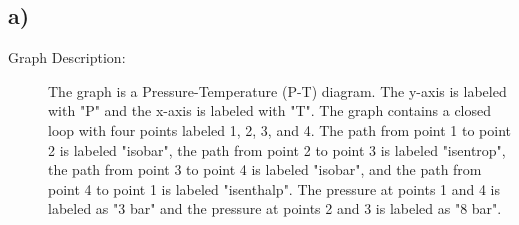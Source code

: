 

\subsection*{a)}

\begin{description}
    \item[Graph Description:] The graph is a Pressure-Temperature (P-T) diagram. The y-axis is labeled with "P" and the x-axis is labeled with "T". The graph contains a closed loop with four points labeled 1, 2, 3, and 4. The path from point 1 to point 2 is labeled "isobar", the path from point 2 to point 3 is labeled "isentrop", the path from point 3 to point 4 is labeled "isobar", and the path from point 4 to point 1 is labeled "isenthalp". The pressure at points 1 and 4 is labeled as "3 bar" and the pressure at points 2 and 3 is labeled as "8 bar".
\end{description}